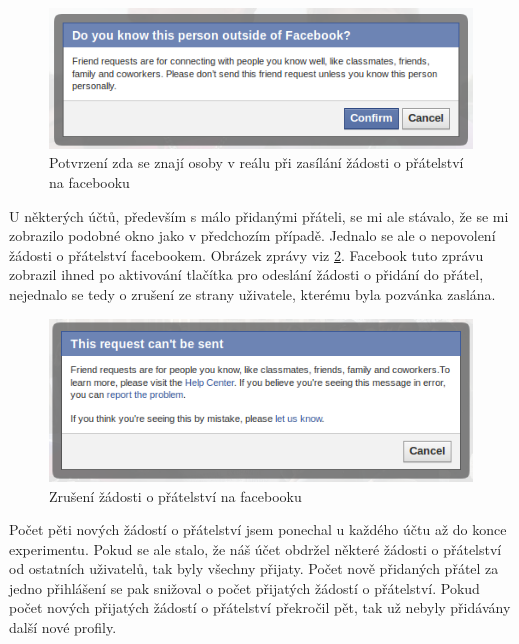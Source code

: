 \documentclass[thesis=M,czech]{FITthesis}[2013/05/10]
\begin{document}
\begin{figure}[h]
\begin{center}
\includegraphics[width=5in]{figures/confirm-friendship.png}
\caption{Potvrzení zda se znají osoby v reálu při zasílání žádosti o přátelství na facebooku}
\label{fig:confirmFriendship}
\end{center}
\end{figure}

U některých účtů, především s málo přidanými přáteli, se mi ale stávalo, že se mi zobrazilo podobné okno jako v předchozím případě. Jednalo se ale o nepovolení žádosti o přátelství facebookem. Obrázek zprávy viz \ref{fig:cantFriend}. Facebook tuto zprávu zobrazil ihned po aktivování tlačítka pro odeslání žádosti o přidání do přátel, nejednalo se tedy o zrušení ze strany uživatele, kterému byla pozvánka zaslána.

\begin{figure}[h]
\begin{center}
\includegraphics[width=5in]{figures/cantFriend.png}
\caption{Zrušení žádosti o přátelství na facebooku}
\label{fig:cantFriend}
\end{center}
\end{figure}

Počet pěti nových žádostí o přátelství jsem ponechal u každého účtu až do konce experimentu. Pokud se ale stalo, že náš účet obdržel některé žádosti o přátelství od ostatních uživatelů, tak byly všechny přijaty. Počet nově přidaných přátel za jedno přihlášení se pak snižoval o počet přijatých žádostí o přátelství. Pokud počet nových přijatých žádostí o přátelství překročil pět, tak už nebyly přidávány další nové profily.
\end{document}
